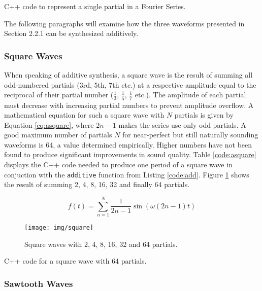 \begin{table}
  \caption{C++ code to represent a single partial in a Fourier Series.}
  \label{code:partial}
\end{table}

\noindent The following paragraphs will examine how the three waveforms presented in Section 2.2.1 can be synthesized additively.

\subsubsection{Square Waves}

When speaking of additive synthesis, a square wave is the result of summing all odd-numbered partials (3rd, 5th, 7th etc.) at a respective amplitude equal to the reciprocal of their partial number ($\frac{1}{3}$, $\frac{1}{5}$, $\frac{1}{7}$ etc.). The amplitude of each partial must decrease with increasing partial numbers to prevent amplitude overflow. A mathematical equation for such a square wave with $N$ partials is given by Equation \ref{eq:asquare}, where $2n - 1$ makes the series use only odd partials. A good maximum number of partials $N$ for near-perfect but still naturally sounding waveforms is 64, a value determined empirically. Higher numbers have not been found to produce significant improvements in sound quality. Table \ref{code:asquare} displays the C++ code needed to produce one period of a square wave in conjuction with the \texttt{additive} function from Listing \ref{code:add}. Figure \ref{fig:square} shows the result of summing 2, 4, 8, 16, 32 and finally 64 partials.

\begin{equation}
  f(t) = \sum\limits_{n=1}^N \frac{1}{2n -1} \sin(\omega (2n - 1) t)
  \label{eq:asquare}
\end{equation}

\begin{figure}[p!]
  \texttt{[image: img/square]}
  \caption{Square waves with 2, 4, 8, 16, 32 and 64 partials.}
  \label{fig:square}
\end{figure}

\begin{table}[p!]
  \caption{C++ code for a square wave with 64 partials.}
  \label{code:asquare}
\end{table}

\pagebreak

\subsubsection{Sawtooth Waves}

